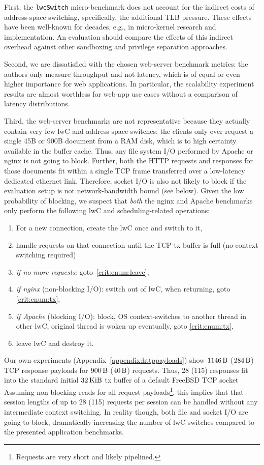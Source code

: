 \documentclass[10pt,twocolumn,a4paper]{article}
\begin{document}
First, the \lstinline{lwcSwitch} micro-benchmark does not account for the indirect costs of address-space switching, specifically, the additional TLB pressure.
These effects have been well-known for decades, e.g., in micro-kernel research  and implementation. \cite{liedtke1997achievedipcperformance} 
An evaluation should compare the effects of this indirect overhead against other sandboxing and privilege separation approaches.

Second, we are dissatisfied with the chosen web-server benchmark metrics:
the authors only measure throughput and not latency, which is of equal or even higher importance for web applications.
In particular, the scalability experiment results are almost worthless for web-app use cases without a comparison of latency distributions.

Third, the web-server benchmarks are not representative because they actually contain very few lwC and address space switches:
the clients only ever request a single 45B or 900B document from a RAM disk, which is to high certainty available in the buffer cache.
Thus, any file system I/O performed by Apache or nginx is not going to block.
Further, both the HTTP requests and responses for those documents fit within a single TCP frame transferred over a low-latency dedicated ethernet link.
Therefore, socket I/O is also not likely to block if the evaluation setup is not network-bandwidth bound (see below).
Given the low probability of blocking, we suspect that \textit{both} the nginx and Apache benchmarks only perform the following lwC and scheduling-related operations:
\begin{enumerate}[nosep]
\item For a new connection, create the lwC once and switch to it,
\item\label{crit:enum:tx} handle requests on that connection until the TCP tx buffer is full (no context switching required)
\item \textit{if no more requests}: goto~\ref{crit:enum:leave},
\item \textit{if nginx} (non-blocking I/O): switch out of lwC, when returning, goto \ref{crit:enum:tx},
\item \textit{if Apache} (blocking I/O): block, OS context-switches to another thread in other lwC, original thread is woken up eventually, goto \ref{crit:enum:tx},
\item\label{crit:enum:leave} leave lwC and destroy it.
\end{enumerate}
Our own experiments (Appendix~\ref{appendix:httppayloads}) show $\SI{1146}{\byte}$ ($\SI{284}{\byte}$) TCP response payloads for $\SI{900}{\byte}$ ($\SI{40}{\byte}$) requests.
Thus, 28 (115) responses fit into the standard initial $\SI{32}{\kibi\byte}$ tx buffer of a default FreeBSD TCP socket~\cite{fbsd11tcpsendspace}
Assuming non-blocking reads for all request payloads\footnote{Requests are very short and likely pipelined.}, this implies that that session lengths of up to 28 (115) requests per session can be handled without any intermediate context switching.
In reality though, both file and socket I/O are going to block, dramatically increasing the number of lwC switches compared to the presented application benchmarks.
\end{document}

